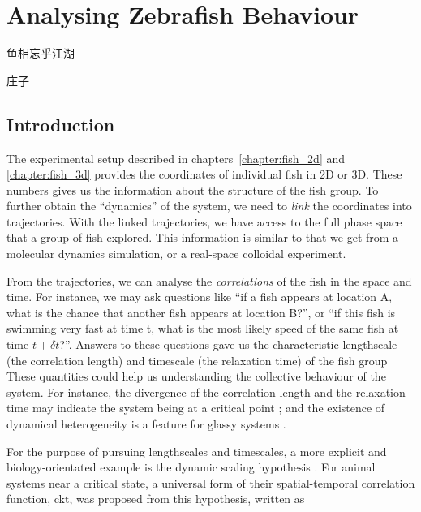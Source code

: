 \documentclass[11pt,twoside]{report}
\begin{document}
\chapter{Analysing Zebrafish Behaviour}
\label{chapter:fish_analysis}

\epigraph{鱼相忘乎江湖}{庄子}

\section{Introduction}


The experimental setup described in chapters~\ref{chapter:fish_2d} and \ref{chapter:fish_3d} provides the coordinates of individual fish in 2D or 3D. These numbers gives us the information about the structure of the fish group.
To further obtain the ``dynamics'' of the system, we need to \emph{link} the coordinates into trajectories.
With the linked trajectories, we have access to the full phase space that a group of fish explored. This information is similar to that we get from a molecular dynamics simulation, or a real-space colloidal experiment.

From the trajectories, we can analyse the \emph{correlations} of the fish in the space and time. For instance, we may ask questions like ``if a fish appears at location A, what is the chance that another fish appears at location B?'', or ``if this fish is swimming very fast at time \gls{t}, what is the most likely speed of the same fish at time $t+\delta t$?''. Answers to these  questions
gave us the characteristic lengthscale (the correlation length) and timescale (the relaxation time) of the fish group These quantities could help us understanding the collective behaviour of the system.
For instance, the divergence of the correlation length and the relaxation time may indicate the system being at a critical point \cite{newman1999}; and the existence of dynamical heterogeneity is a feature for glassy systems \cite{berthier2011}.

For the purpose of pursuing lengthscales and timescales, a more explicit and biology-orientated example is the dynamic scaling hypothesis \cite{cavagna2017np}. For animal systems near a  critical state, a universal form of their spatial-temporal correlation function, \gls{ckt}, was proposed from this hypothesis, written as
\end{document}
